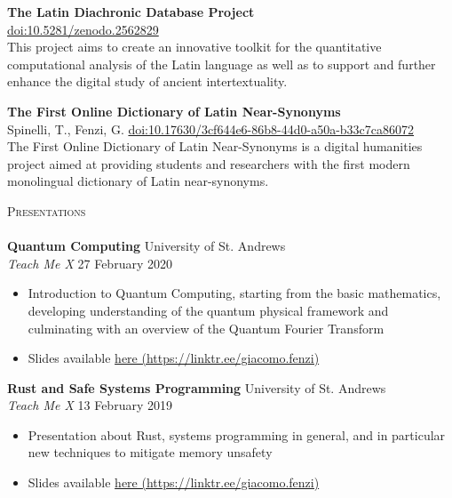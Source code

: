 \documentclass[a4paper]{article}
\newcommand{\lineunder} {
    \vspace*{-8pt} \\
    \hspace*{-18pt} \hrulefill \\
}
\newcommand{\header} [1] {
    {\hspace*{-18pt}\vspace*{6pt} \textsc{#1}}
    \vspace*{-6pt} \lineunder
}
\begin{document}
\vbox{
    {\textbf{The Latin Diachronic Database Project}}  \\
     \hfill  \href{https://zenodo.org/record/2562829}{doi:10.5281/zenodo.2562829} \\
    This project aims to create an innovative toolkit for the quantitative computational analysis of the Latin language as well as to support and further enhance the digital study of ancient intertextuality. \\
    \vspace*{2mm}
}

\vbox{
    {\textbf{The First Online Dictionary of Latin Near-Synonyms}} \\
    Spinelli, T., Fenzi, G. \hfill \href{https://risweb.st-andrews.ac.uk/portal/en/datasets/the-first-online-dictionary-of-latin-nearsynonyms(3cf644e6-86b8-44d0-a50a-b33c7ca86072).html}{doi:10.17630/3cf644e6-86b8-44d0-a50a-b33c7ca86072}\\
    The First Online Dictionary of Latin Near-Synonyms is a digital humanities project aimed at providing students and researchers with the first modern monolingual dictionary of Latin near-synonyms. \\
}

\header{Presentations}

\textbf{Quantum Computing} \hfill University of St. Andrews \\
\textit{Teach Me X} \hfill{27 February 2020}
\vspace{-1mm}
\begin{itemize} \itemsep 1pt
    \item Introduction to Quantum Computing, starting from the basic mathematics, developing understanding of the quantum physical framework
    and culminating with an overview of the Quantum Fourier Transform
    \item Slides available \href{https://github.com/WizardOfMenlo/QuantumPresentationTMX}{here (https://linktr.ee/giacomo.fenzi)} 
\end{itemize}

\textbf{Rust and Safe Systems Programming} \hfill University of St. Andrews \\
\textit{Teach Me X} \hfill{13 February 2019}
\vspace{-1mm}
\begin{itemize} \itemsep 1pt
    \item Presentation about Rust, systems programming in general, and in particular new techniques to mitigate memory unsafety
    \item Slides available \href{https://docs.google.com/presentation/d/1ui4ByY8qFhqAsdYoyPBPzhyg8AbV5YJKAN9sNwv5QPw/edit?usp=sharing}{here (https://linktr.ee/giacomo.fenzi)} 
\end{itemize}
\end{document}
